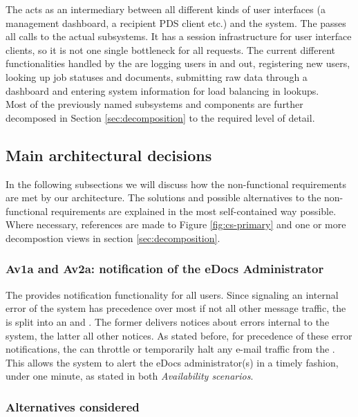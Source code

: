 The  acts as an intermediary between all different kinds of user interfaces (a management dashboard, a recipient PDS client etc.) and the system. The  passes all calls to the actual subsystems. It has a session infrastructure for user interface clients, so it is not one single bottleneck for all requests. The current different functionalities handled by the  are logging users in and out, registering new users, looking up job statuses and documents, submitting raw data through a dashboard and entering system information for load balancing in lookups.\\
Most of the previously named subsystems and components are further decomposed in Section \ref{sec:decomposition} to the required level of detail.

\subsection{Main architectural decisions}
In the following subsections we will discuss how the non-functional requirements are met by our architecture. The solutions and possible alternatives to the non-functional requirements are explained in the most self-contained way possible. Where necessary, references are made to Figure \ref{fig:cs-primary} and one or more decompostion views in section \ref{sec:decomposition}.

\subsubsection{Av1a and Av2a: notification of the eDocs Administrator}\label{march:av1a-av2a}
The  provides notification functionality for all users. Since signaling an internal error of the system has precedence over most if not all other message traffic, the  is split into an  and . The former delivers notices about errors internal to the system, the latter all other notices. As stated before, for precedence of these error notifications, the  can throttle or temporarily halt any e-mail traffic from the . This allows the system to alert the eDocs administrator(s) in a timely fashion, under one minute, as stated in both \emph{Availability scenarios}.

\subsubsection*{Alternatives considered}
